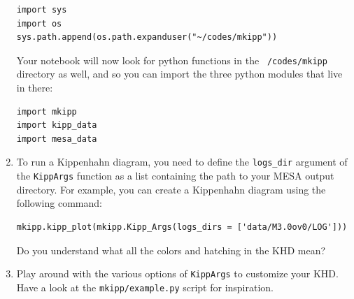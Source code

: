 \documentclass[11pt,a4paper]{article}
\newcommand{\todo}[1]{\textbf{\textcolor{red}{#1}}}
\begin{document}
\begin{enumerate}
\begin{lstlisting}[style=pythonstyle]
import sys
import os
sys.path.append(os.path.expanduser("~/codes/mkipp"))
\end{lstlisting}

  Your notebook will now look for python functions in the \texttt{~/codes/mkipp} directory as well, and so you can import the three python modules that live in there:

\begin{lstlisting}[style=pythonstyle]
import mkipp
import kipp_data
import mesa_data
\end{lstlisting}

\item To run a Kippenhahn diagram, you need to define the \texttt{logs\_dir} argument of the \texttt{KippArgs} function as a list containing the path to your MESA output directory. For example, you can create a Kippenhahn diagram using the following command:

\begin{lstlisting}[style=pythonstyle]
mkipp.kipp_plot(mkipp.Kipp_Args(logs_dirs = ['data/M3.0ov0/LOG']))
\end{lstlisting}

Do you understand what all the colors and hatching in the KHD mean? 

\item Play around with the various options of \texttt{KippArgs} to customize your KHD. Have a look at the \texttt{mkipp/example.py} script for inspiration. 

\end{enumerate}



% 
% 
\end{document}
